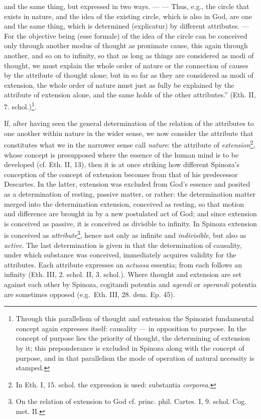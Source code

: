 \documentclass[12pt,a4paper,openany]{book}
\newcommand{\opage}[1]{\marginnote{\footnotesize\textit{[#1]}}}
\begin{document}
and the same thing, but expressed in two ways. --- --- Thus, e.g.,
the circle that exists in nature, and the idea of the existing circle,
which is also in God, are one and the same thing, which is determined
(explicatur) by different attributes. --- For the objective being
(esse formale) of the idea of the circle can be conceived only through
another modus of thought as proximate cause, this again through another, and
so on to infinity, so that as long as things are considered as
modi of thought, we must explain the whole order of nature
or the connection of causes by the attribute of thought alone;
but in so far as they are considered as modi of extension, the whole order of nature
must just as fully be explained by the
\opage{74}\setcounter{footnote}{0}attribute of extension alone, and the same holds of the other attributes.'' (Eth. II,
7. schol.)\footnote{Through this parallelism of thought and
extension the Spinozist fundamental concept again expresses itself:
causality --- in opposition to purpose. In the concept of purpose
lies the priority of thought, the determining of extension by it; this
preponderance is excluded in Spinoza along with the concept of purpose, and in that
parallelism the mode of operation of natural necessity is stamped.}.

If, after having seen the general determination of the
relation of the attributes to one another within nature in the wider
sense, we now consider the attribute that constitutes what we in the narrower
sense call \emph{nature}: the attribute of \emph{extension}\footnote{In Eth. I, 15.
schol. the expression is used: substantia \emph{corporea}.}, whose
concept is presupposed where the essence of the human mind is to be
developed (cf. Eth. II, 13), then it is at once striking how
different Spinoza's conception of the concept of extension becomes
from that of his predecessor Descartes. In the latter, extension was
excluded from God's essence and posited as a determination of
resting, passive matter, or rather: the determination matter
merged into the determination extension, conceived as resting,
so that motion and difference are brought in by a new postulated
act of God; and since extension is conceived as passive, it is conceived
as divisible to infinity. In Spinoza extension is
conceived as \emph{attribute}\footnote{On the relation of extension to God
cf. princ. phil. Cartes. I, 9. schol. Cog. met. II.}, hence
not only as infinite and \emph{indivisible}, but also as \emph{active}. The
last determination is given in that the determination of causality,
under which substance was conceived, immediately acquires validity for
the attributes. Each attribute expresses an \emph{actuosa} essentia; from
each follows an infinity (Eth. III, 2. schol. II, 3. schol.).
Where thought and extension are set against each other by Spinoza,
cogitandi potentia and \emph{agendi} or
\emph{operandi} potentia are sometimes opposed (e.g.\ Eth. III, 28. dem. Ep. 45).
\end{document}

